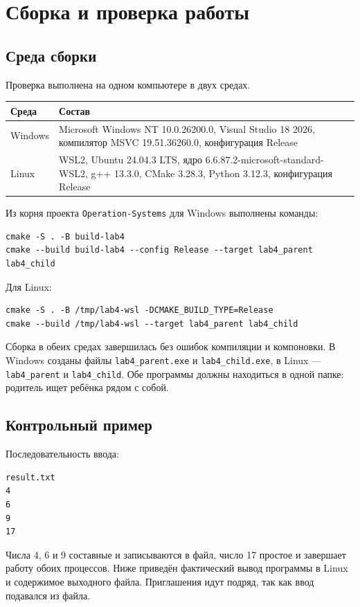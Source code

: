 \section{Сборка и проверка работы}
\subsection{Среда сборки}
Проверка выполнена на одном компьютере в двух средах.

\begin{center}
\begin{tabular}{p{}p{}}
Среда & Состав \\
\hline
Windows & Microsoft Windows NT 10.0.26200.0, Visual Studio 18 2026, компилятор MSVC 19.51.36260.0, конфигурация Release \\
Linux & WSL2, Ubuntu 24.04.3 LTS, ядро 6.6.87.2-microsoft-standard-WSL2, g++ 13.3.0, CMake 3.28.3, Python 3.12.3, конфигурация Release \\
\end{tabular}
\end{center}

Из корня проекта \texttt{Operation-Systems} для Windows выполнены команды:
\begin{verbatim}
cmake -S . -B build-lab4
cmake --build build-lab4 --config Release --target lab4_parent lab4_child
\end{verbatim}

Для Linux:
\begin{verbatim}
cmake -S . -B /tmp/lab4-wsl -DCMAKE_BUILD_TYPE=Release
cmake --build /tmp/lab4-wsl --target lab4_parent lab4_child
\end{verbatim}

Сборка в обеих средах завершилась без ошибок компиляции и компоновки. В Windows созданы файлы \texttt{lab4\_parent.exe} и \texttt{lab4\_child.exe}, в Linux --- \texttt{lab4\_parent} и \texttt{lab4\_child}. Обе программы должны находиться в одной папке: родитель ищет ребёнка рядом с собой.

\subsection{Контрольный пример}
Последовательность ввода:
\begin{verbatim}
result.txt
4
6
9
17
\end{verbatim}

Числа 4, 6 и 9 составные и записываются в файл, число 17 простое и завершает работу обоих процессов. Ниже приведён фактический вывод программы в Linux и содержимое выходного файла. Приглашения идут подряд, так как ввод подавался из файла.

